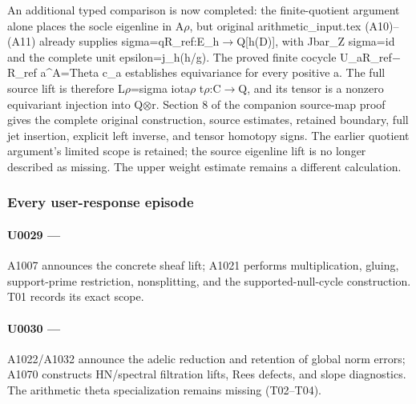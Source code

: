 An additional typed comparison is now completed: the finite-quotient
argument alone places the socle eigenline in
A\allowbreak{}\ensuremath{ρ}\allowbreak{}, but original
arithmetic\_input.tex (A10)--(A11) already supplies
sigma=qR\_ref:E\_h\allowbreak{}\ensuremath{→}\allowbreak{}Q[h(D)], with
Jbar\_Z sigma=id and the complete unit epsilon=j\_h(h/g). The proved
finite cocycle U\_aR\_ref\allowbreak{}\ensuremath{−}\allowbreak{}R\_ref
a\^{}A=Theta c\_a establishes equivariance for every positive a. The
full source lift is therefore
L\allowbreak{}\ensuremath{ρ}\allowbreak{}=sigma
iota\allowbreak{}\ensuremath{ρ}\allowbreak{}
t\allowbreak{}\ensuremath{ρ}\allowbreak{}:C\allowbreak{}\ensuremath{→}\allowbreak{}Q,
and its tensor is a nonzero equivariant injection into
Q\allowbreak{}\ensuremath{⊗}\allowbreak{}r. Section 8 of the companion
source-map proof gives the complete original construction, source
estimates, retained boundary, full jet insertion, explicit left inverse,
and tensor homotopy signs. The earlier quotient argument's limited scope
is retained; the source eigenline lift is no longer described as
missing. The upper weight estimate remains a different calculation.

\subsubsection{Every user-response
episode}\label{every-user-response-episode}

\paragraph{\texorpdfstring{U0029 ---
\protect{}}{U0029 --- }}\label{u0029-53352f69-6c38-4cab-a6aa-c225647ebe9a}

A1007 announces the concrete sheaf lift; A1021 performs multiplication,
gluing, support-prime restriction, nonsplitting, and the
supported-null-cycle construction. T01 records its exact scope.

\paragraph{\texorpdfstring{U0030 ---
\protect{}}{U0030 --- }}\label{u0030-2e3cac15-6cbf-4fbd-b826-ceed04867399}

A1022/A1032 announce the adelic reduction and retention of global norm
errors; A1070 constructs HN/spectral filtration lifts, Rees defects, and
slope diagnostics. The arithmetic theta specialization remains missing
(T02--T04).

